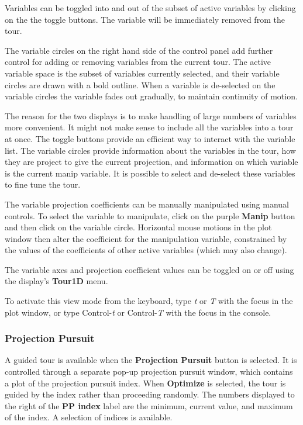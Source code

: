 \documentclass[11pt]{article}
\def\Widget#1{\textbf{#1}}
\begin{document}
Variables can be toggled into and out of the subset of active
variables by clicking on the the toggle buttons. The variable will be
immediately removed from the tour. 

The variable circles on the right hand side of the control panel add
further control for adding or removing variables from the current
tour. The active variable space is the subset of variables currently
selected, and their variable circles are drawn with a bold
outline. When a variable is de-selected on the variable circles the
variable fades out gradually, to maintain continuity of motion.

The reason for the two displays is to make handling of large numbers
of variables more convenient. It might not make sense to include all
the variables into a tour at once. The toggle buttons provide an
efficient way to interact with the variable list. The variable circles
provide information about the variables in the tour, how they are
project to give the current projection, and information on which
variable is the current manip variable. It is possible to select and
de-select these variables to fine tune the tour. 

The variable projection coefficients can be manually manipulated
using manual controls. To select the variable to manipulate, click on
the purple \Widget{Manip} button and then click on the variable circle.
Horizontal mouse motions in the plot window then alter the coefficient for
the manipulation variable, constrained by the values of the coefficients
of other active variables (which may also change).

The variable axes and projection coefficient values can be toggled on
or off using the display's \Widget{Tour1D} menu.

To activate this view mode from the keyboard, type {\em t} or {\em T}
with the focus in the plot window, or type Control-{\em t} or
Control-{\em T} with the focus in the console.

\subsubsection{Projection Pursuit}

A guided tour is available when the \Widget{Projection Pursuit} button
is selected. It is controlled through a separate pop-up projection
pursuit window, which contains a plot of the projection pursuit index.
When \Widget{Optimize} is selected, the tour is guided by the index
rather than proceeding randomly.  The numbers displayed to the right
of the \Widget{PP index} label are the minimum, current value, and
maximum of the index.  A selection of indices is available.
\end{document}
